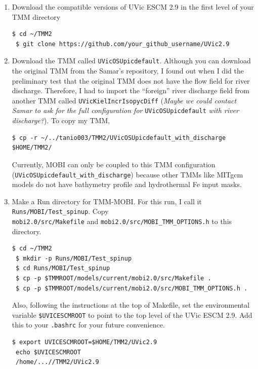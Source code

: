 \documentclass[a4paper]{article}
\def\noin{\noindent }
\begin{document}
\begin{enumerate}

\item Download the compatible versions of UVic ESCM 2.9 in the first level of your TMM directory
\begin{lstlisting}[style=DOS]
 $ cd ~/TMM2
 $ git clone https://github.com/your_github_username/UVic2.9
\end{lstlisting}

\item Download the TMM called \verb|UVicOSUpicdefault|. Although you can download the original TMM from the Samar's repository, I found out when I did the preliminary test that the original TMM does not have the flow field for river discharge. Therefore, I had to import the ``foreign'' river discharge field from another TMM called  \verb|UVicKielIncrIsopycDiff| (\emph{Maybe we could contact Samar to ask for the full configuration for} \verb|UVicOSUpicdefault| \emph{with river discharge?}). To copy my TMM, 
\begin{lstlisting}[style=DOS]
 $ cp -r ~/../tanio003/TMM2/UVicOSUpicdefault_with_discharge $HOME/TMM2/
\end{lstlisting}

\noin Currently, MOBI can only be coupled to this TMM configuration (\verb|UVicOSUpicdefault_with_discharge|) because other TMMs like MITgcm models do not have bathymetry profile and hydrothermal Fe input masks.

\item Make a Run directory for TMM-MOBI. For this run, I call it \verb|Runs/MOBI/Test_spinup|. Copy \\ \verb|mobi2.0/src/Makefile| and \verb|mobi2.0/src/MOBI_TMM_OPTIONS.h| to this directory. 
\begin{lstlisting}[style=DOS]
 $ cd ~/TMM2
 $ mkdir -p Runs/MOBI/Test_spinup
 $ cd Runs/MOBI/Test_spinup
 $ cp -p $TMMROOT/models/current/mobi2.0/src/Makefile .
 $ cp -p $TMMROOT/models/current/mobi2.0/src/MOBI_TMM_OPTIONS.h . 
\end{lstlisting}
\noin Also, following the instructions at the top of Makefile, set the environmental variable \verb|$UVICESCMROOT| to point to the top level of the UVic ESCM 2.9. Add this to your \verb|.bashrc| for your future convenience.
\begin{lstlisting}[style=DOS]
 $ export UVICESCMROOT=$HOME/TMM2/UVic2.9
 echo $UVICESCMROOT
 /home/...//TMM2/UVic2.9
\end{lstlisting}


\end{enumerate}
\end{document}
